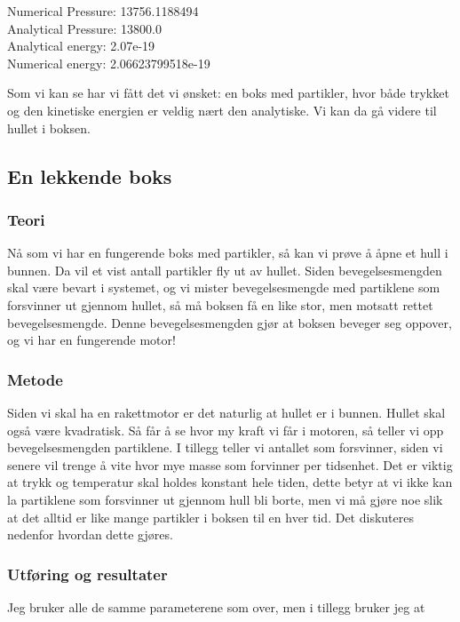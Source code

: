 \documentclass[a4paper,norsk,11pt,twoside]{article}
\begin{document}
\begin{tcolorbox}
Numerical Pressure:  13756.1188494 \\
Analytical Pressure:  13800.0 \\
Analytical energy:  2.07e-19 \\
Numerical energy:  2.06623799518e-19 
\end{tcolorbox}

Som vi kan se har vi fått det vi ønsket: en boks med partikler, hvor både trykket og den kinetiske energien er veldig nært den analytiske. Vi kan da gå videre til hullet i boksen. 

\subsection{En lekkende boks}

\subsubsection{Teori}

Nå som vi har en fungerende boks med partikler, så kan vi prøve å åpne et hull i bunnen. Da vil et vist antall partikler fly ut av hullet. Siden bevegelsesmengden skal være bevart i systemet, og vi mister bevegelsesmengde med partiklene som forsvinner ut gjennom hullet, så må boksen få en like stor, men motsatt rettet bevegelsesmengde. Denne bevegelsesmengden gjør at boksen beveger seg oppover, og vi har en fungerende motor!

\subsubsection{Metode}

Siden vi skal ha en rakettmotor er det naturlig at hullet er i bunnen. Hullet skal også være kvadratisk. Så får å se hvor my kraft vi får i motoren, så teller vi opp bevegelsesmengden partiklene. I tillegg teller vi antallet som forsvinner, siden vi senere vil trenge å vite hvor mye masse som forvinner per tidsenhet. Det er viktig at trykk og temperatur skal holdes konstant hele tiden, dette betyr at vi ikke kan la partiklene som forsvinner ut gjennom hull bli borte, men vi må gjøre noe slik at det alltid er like mange partikler i boksen til en hver tid. Det diskuteres nedenfor hvordan dette gjøres.

\subsubsection{Utføring og resultater}
Jeg bruker alle de samme parameterene som over, men i tillegg bruker jeg at
\end{document}

